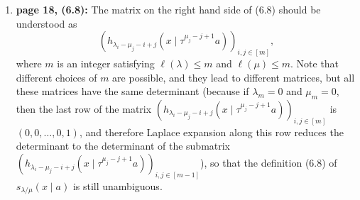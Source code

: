 \documentclass[numbers=enddot,12pt,final,onecolumn,notitlepage]{scrartcl}%
\theoremstyle{definition}
\newenvironment{proof}[1][Proof]{\noindent\textbf{#1.} }{\ \rule{0.5em}{0.5em}}
\let\prodnonlimits\prod
\renewcommand{\prod}{\prodnonlimits\limits}
\begin{document}
\begin{enumerate}
\begin{proof}
\begin{align*}
{{+\cdots+\lambda_{q}\right)  +\left(  \mu_{1}+\mu_{2}+\cdots+\mu_{q}\right)
}\left(  \prod_{i=1}^{p}\left(  -1\right)  ^{\lambda_{i}^{\prime}-i}\right)
\left(  \prod_{j=1}^{p}\left(  -1\right)  ^{\mu_{j}^{\prime}-j}\right)
}_{\substack{=1\\\text{(by Lemma \ref{lem.A6prods})}}}\\
&  \ \ \ \ \ \ \ \ \ \ \cdot\det\left(  e_{\lambda_{i}^{\prime}-\mu
_{j}^{\prime}-i+j}\left(  x\mid\tau^{j-\mu_{j}^{\prime}-1}a\right)  \right)
_{i,j\in\left[  p\right]  }\\
&  =\det\left(  e_{\lambda_{i}^{\prime}-\mu_{j}^{\prime}-i+j}\left(  x\mid
\tau^{j-\mu_{j}^{\prime}-1}a\right)  \right)  _{i,j\in\left[  p\right]  }\\
&  =\det\left(  e_{\lambda_{i}^{\prime}-\mu_{j}^{\prime}-i+j}\left(  x\mid
\tau^{-\mu_{j}^{\prime}+j-1}a\right)  \right)  _{i,j\in\left[  p\right]
}\ \ \ \ \ \ \ \ \ \ \left(  \text{since }j-\mu_{j}^{\prime}-1=-\mu
_{j}^{\prime}+j-1\right)  .
\end{align*}
In view of (6.8), this can be rewritten as%
\[
s_{\lambda/\mu}\left(  x\mid a\right)  =\det\left(  e_{\lambda_{i}^{\prime
}-\mu_{j}^{\prime}-i+j}\left(  x\mid\tau^{-\mu_{j}^{\prime}+j-1}a\right)
\right)  _{i,j\in\left[  p\right]  }.
\]
This proves (6.9).
\end{proof}

Applying (6.9) to $\mu=\varnothing$, we obtain the second equality in (6.7).

\item \textbf{page 18, (6.8):} The matrix on the right hand side of (6.8)
should be understood as%
\[
\left(  h_{\lambda_{i}-\mu_{j}-i+j}\left(  x\mid\tau^{\mu_{j}-j+1}a\right)
\right)  _{i,j\in\left[  m\right]  },
\]
where $m$ is an integer satisfying $\ell\left(  \lambda\right)  \leq m$ and
$\ell\left(  \mu\right)  \leq m$. Note that different choices of $m$ are
possible, and they lead to different matrices, but all these matrices have the
same determinant (because if $\lambda_{m}=0$ and $\mu_{m}=0$, then the last
row of the matrix $\left(  h_{\lambda_{i}-\mu_{j}-i+j}\left(  x\mid\tau
^{\mu_{j}-j+1}a\right)  \right)  _{i,j\in\left[  m\right]  }$ is $\left(
0,0,\ldots,0,1\right)  $, and therefore Laplace expansion along this row
reduces the determinant to the determinant of the submatrix $\left(
h_{\lambda_{i}-\mu_{j}-i+j}\left(  x\mid\tau^{\mu_{j}-j+1}a\right)  \right)
_{i,j\in\left[  m-1\right]  }$), so that the definition (6.8) of
$s_{\lambda/\mu}\left(  x\mid a\right)  $ is still unambiguous.


\end{enumerate}
\end{document}
